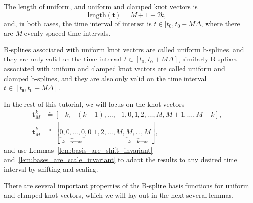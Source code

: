 \documentclass{article}
\newcommand{\defeq}{\circeq}
\begin{document}
The length of uniform, and uniform and clamped knot vectors is 
\[
\text{length}(\mathbf{t}) = M+1 + 2k,
\]
and, in both cases, the time interval of interest is $t\in[t_0, t_0+M\Delta$, where there are $M$ evenly spaced time intervals. 

B-splines associated with uniform knot vectors are called uniform b-splines, and they are only valid on the time interval $t\in[t_0, t_0+M\Delta]$, similarly B-splines associated with uniform and clamped knot vectors are called uniform and clamped b-splines, and they are also only valid on the time interval $t\in[t_0, t_0+M\Delta]$.

In the rest of this tutorial, we will focus on the knot vectors
\begin{align}
	\mathbf{t}^k_M &\defeq [-k, -(k-1), \dots, -1, 0, 1, 2, \dots, M, M+1, \dots, M+k],
		\label{eq:knot_vector_t_M} \\ 
	\bar{\mathbf{t}}^k_M &\defeq [\underbrace{0, 0, \dots, 0}_{k-\text{terms}}, 0, 1, 2, \dots, M, \underbrace{M, \dots, M}_{k-\text{terms}}], 
	\label{eq:knot_vector_tbar_M}
\end{align}
and use Lemmas~\ref{lem:basis_are_shift_invariant} and~\ref{lem:bases_are_scale_invariant} to adapt the results to any desired time interval by shifting and scaling.

There are several important properties of the B-spline basis functions for uniform and clamped knot vectors, which we will lay out in the next several lemmas.
\end{document}
